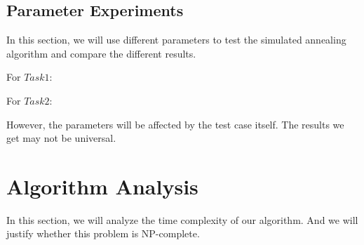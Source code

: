 \documentclass{llncs}
\begin{document}
	\subsection{Parameter Experiments} \label{subsec-expr}
	In this section, we will use different parameters to test the simulated annealing algorithm and compare the different results. 
	
	For $Task1$:
	
	\begin{table}[H]
		\caption{The average result of Task1 for different parameters}
		\begin{center}
			\label{table-task1}
		\end{center}
	\end{table}

	For $Task2$:
	
	\begin{table}[H]
		\caption{The average result of Task2 for different parameters}
		\begin{center}
			\label{table-task2}
		\end{center}
	\end{table}
	
	However, the parameters will be affected by the test case itself. The results we get may not be universal. 
	
	
	\section{Algorithm Analysis} \label{sec-analysis}
	In this section, we will analyze the time complexity of our algorithm. And we will justify whether this problem is NP-complete.
\end{document}

